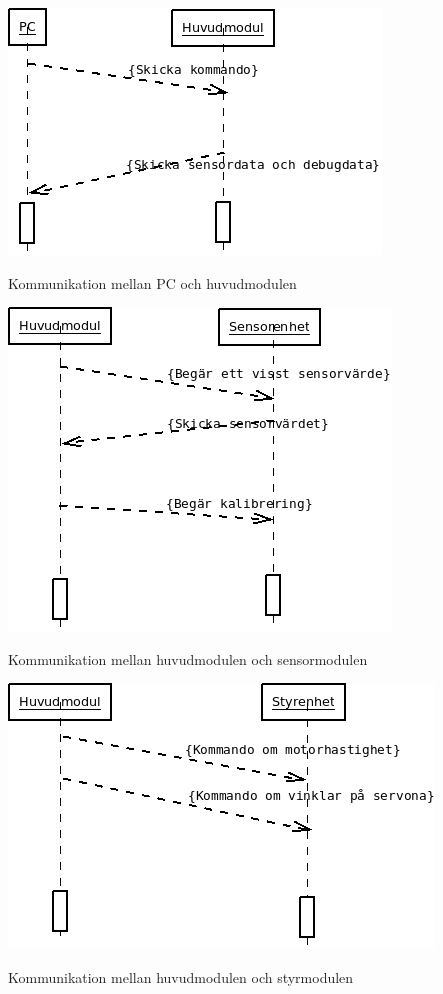 \centerline{\includegraphics[scale=0.6]{PC-huvud}}
\centerline{Kommunikation mellan PC och huvudmodulen}
\newline
\newline
\centerline{\includegraphics[scale=0.6]{huvud-sensor}}
\centerline{Kommunikation mellan huvudmodulen och sensormodulen}
\newline
\newline
\centerline{\includegraphics[scale=0.6]{huvud-styr}}
\centerline{Kommunikation mellan huvudmodulen och styrmodulen}

